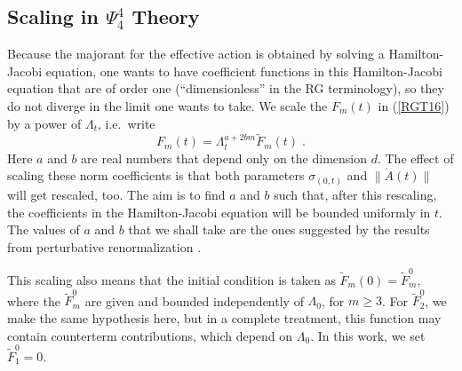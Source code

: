 \documentclass[12pt,twoside]{amsart}
\newcommand{\beq}{\begin{equation}}
\newcommand{\eeq}{\end{equation}}
\numberwithin{equation}{section}
\newcommand{\enquote}[1]{``#1''}
\begin{document}
\subsection{Scaling in $\Psi_{4}^{4}$ Theory}\label{scalingphi4}

Because the majorant for the effective action is obtained by solving a Hamilton-Jacobi equation,  one wants to have coefficient functions in this Hamilton-Jacobi equation that are of order one (\enquote{dimensionless} in the RG terminology), so they do not diverge in the limit one wants to take. We scale the $F_{m}(t)$ in (\ref{RGT16}) by a power of $\Lambda_t$, i.e.\ write 
\beq\label{tilF}
F_{m}(t)=\Lambda_{t}^{a+2bm} \tilde F_{m}(t) \; .
\eeq 
Here $a$ and $b$ are real numbers that depend only on the dimension $d$. The effect of scaling these norm coefficients is that both parameters $\sigma_{(0,t)}$ and $\|\dot{A}(t)\|$ will get rescaled, too.  The aim is to find $a$ and $b$ such that, after this rescaling, the coefficients in the Hamilton-Jacobi equation will be bounded uniformly in $t$. The values of $a$ and $b$ that we shall take are the ones suggested by the results from perturbative renormalization \cite{MSbook}. 

This scaling also means that the initial condition is taken as $\tilde F_m (0) = \tilde F_m^0$, where the $\tilde F_m^0$ are given and bounded independently of $\Lambda_0$, for $m \ge 3$. For $\tilde F_2^0$, we make the same hypothesis here, but in a complete treatment, this function may contain counterterm contributions, which depend on $\Lambda_0$. In this work, we set $\tilde F_1^0 = 0$. 
\end{document}
